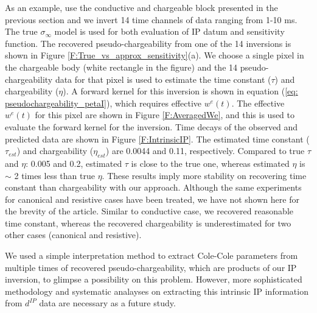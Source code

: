 \documentclass[a4paper, 11pt]{article}
\newcommand{\siginf}{\sigma_\infty}
\newcommand{\dip}{d^{IP}}
\begin{document}
As an example, use the conductive and chargeable block presented in the previous section and we invert 14 time channels of data ranging from 1-10 ms.  The true $\siginf$ model is used  for both evaluation of IP datum and sensitivity function. The recovered pseudo-chargeability from one of the 14 inversions is shown in Figure \ref{F:True_vs_approx_sensitivity}(a). We choose a single pixel in the chargeable body (white rectangle in the figure) and the 14 pseudo-chargeability data for that pixel is used to estimate the time constant ($\tau$) and chargeability ($\eta$). 
A forward kernel for this inversion is shown in equation (\ref{eq: pseudochargeability_petaI}), which requires effective $w^e(t)$. 
The effective $w^e(t)$ for this pixel are shown in Figure \ref{F:AveragedWe}, and this is used to evaluate the forward kernel for the inversion.
Time decays of the observed and predicted data are shown in Figure \ref{F:IntrinsicIP}.
The estimated time constant ($\tau_{est}$) and chargeability ($\eta_{est}$) are 0.0044 and 0.11, respectively. 
Compared to true $\tau$ and $\eta$: 0.005 and 0.2, estimated $\tau$ is close to the true one, whereas estimated $\eta$ is $\sim$ 2 times less than true $\eta$. 
These results imply more stability on recovering time constant than chargeability with our approach. Although the same experiments for canonical and resistive cases have been treated, we have not shown here for the brevity of the article.
Similar to conductive case, we recovered reasonable time constant, whereas the recovered chargeability is underestimated for two other cases (canonical and resistive). 

We used a simple interpretation method to extract Cole-Cole parameters from multiple times of recovered pseudo-chargeability, which are products of our IP inversion, to glimpse a possibility on this problem. 
However, more sophisticated methodology and systematic analayses on extracting this intrinsic IP information from $\dip$ data are necessary as a future study. 
\end{document}
